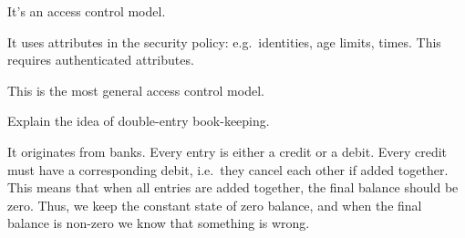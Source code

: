\begin{solution}
  It's an access control model.

  It uses attributes in the security policy: e.g.\ identities, age limits, 
  times.
  This requires authenticated attributes.

  This is the most general access control model.
\end{solution}


\question[3]\label{q:accountability}
Explain the idea of double-entry book-keeping.

\begin{solution}
  It originates from banks.
  Every entry is either a credit or a debit.
  Every credit must have a corresponding debit, i.e.\ they cancel each other if 
  added together.
  This means that when all entries are added together, the final balance should 
  be zero.
  Thus, we keep the constant state of zero balance, and when the final balance 
  is non-zero we know that something is wrong.
\end{solution}


